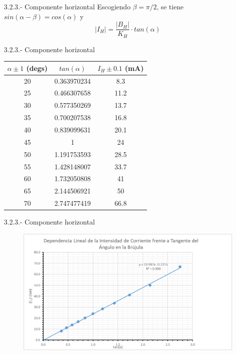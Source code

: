 \documentclass{beamer}
\providecommand{\abs}[1]{\left|#1\right|}
\begin{document}
\begin{frame}{3.2.3.- Componente horizontal}
    Escogiendo $\beta = \pi/2$, se tiene $sin(\alpha - \beta) = cos(\alpha)$ y \pause
    \begin{equation}
        \abs{I_{H}} = \frac{\abs{B_{H}}}{K_{H}} \cdot tan(\alpha)\nonumber
    \end{equation}
\end{frame}
\begin{frame}{3.2.3.- Componente horizontal}
    \begin{table}[]
\begin{tabular}{|c|c|c|}
\hline
$\alpha \pm 1$ (degs) & $tan(\alpha)$      & $I_{H} \pm 0.1$ (mA) \\ \hline
20        & 0.363970234 & 8.3     \\ \hline
25        & 0.466307658 & 11.2    \\ \hline
30        & 0.577350269 & 13.7    \\ \hline
35        & 0.700207538 & 16.8    \\ \hline
40        & 0.839099631 & 20.1    \\ \hline
45        & 1           & 24      \\ \hline
50        & 1.191753593 & 28.5    \\ \hline
55        & 1.428148007 & 33.7    \\ \hline
60        & 1.732050808 & 41      \\ \hline
65        & 2.144506921 & 50      \\ \hline
70        & 2.747477419 & 66.8    \\ \hline
\end{tabular}
\end{table}
\end{frame}
\begin{frame}{3.2.3.- Componente horizontal}
    \begin{figure}
        \centering
        \includegraphics[scale=0.5]{image3.png}
        \label{fig:my_label}
    \end{figure}
\end{frame}
\end{document}
